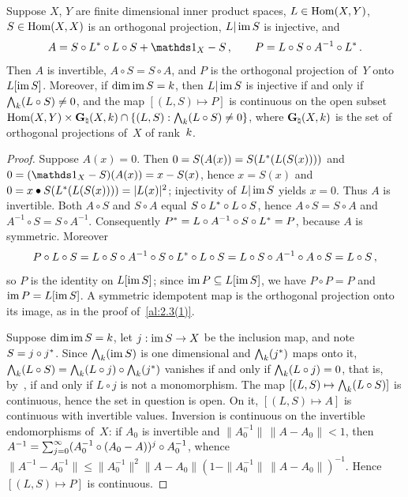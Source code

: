 \begin{lemma}[new\MS]
    \label{new:projection_formula}
    Suppose $X$, $Y$ are finite dimensional inner product spaces, $L \in \operatorname{Hom}(X,Y)$, $S \in
    \operatorname{Hom}(X,X)$ is an orthogonal projection, $L | \operatorname{im} S$ is injective, and
    \begin{displaymath}
        A = S \circ \transpose{L} \circ L \circ S + \id{X} - S \,, \qquad P = L \circ S \circ
        A^{-1} \circ \transpose{L} \,.
    \end{displaymath}
    Then $A$ is invertible, $A \circ S = S \circ A$, and $P$ is the orthogonal projection of~$Y$
    onto $L[\operatorname{im} S]$. Moreover, if $\dim \operatorname{im} S = k$, then $L | \operatorname{im} S$ is injective if and
    only if ${\textstyle\boldsymbol{\bigwedge}}_{{k}}(L \circ S) \ne 0$, and the map $[(L,S) \mapsto P]$ is continuous on
    the open subset $\operatorname{Hom}(X,Y) \times \mathbf{G}_{\natural}(X,k) \cap \{ (L,S) : {\textstyle\boldsymbol{\bigwedge}}_{{k}}(L
    \circ S) \ne 0 \}$, where $\mathbf{G}_{\natural}(X,k)$ is the set of orthogonal projections of~$X$
    of rank~$k$.
\end{lemma}

\begin{proof}
    Suppose $A(x) = 0$. Then $0 = S(A(x)) = S(L^{*}(L(S(x))))$ and $0 = (\id{X} -
    S)(A(x)) = x - S(x)$, hence $x = S(x)$ and $0 = x \bullet S(L^{*}(L(S(x)))) =
    |L(x)|^2$; injectivity of $L | \operatorname{im} S$ yields $x = 0$. Thus $A$ is invertible. Both $A
    \circ S$ and $S \circ A$ equal $S \circ L^{*} \circ L \circ S$, hence $A \circ S = S
    \circ A$ and $A^{-1} \circ S = S \circ A^{-1}$. Consequently $P^{*} = L \circ
    A^{-1} \circ S \circ L^{*} = P$, because $A$ is symmetric. Moreover
    \begin{displaymath}
        P \circ L \circ S = L \circ S \circ A^{-1} \circ S \circ L^{*} \circ L \circ S =
        L \circ S \circ A^{-1} \circ A \circ S = L \circ S \,,
    \end{displaymath}
    so $P$ is the identity on $L[\operatorname{im} S]$; since $\operatorname{im} P \subseteq L[\operatorname{im} S]$, we have $P \circ P
    = P$ and $\operatorname{im} P = L[\operatorname{im} S]$. A symmetric idempotent map is the orthogonal projection onto
    its image, as in the proof of~\ref{al:2.3(1)}.

    Suppose $\dim \operatorname{im} S = k$, let $j : \operatorname{im} S \to X$ be the inclusion map, and note $S = j
    \circ j^{*}$. Since ${\textstyle\boldsymbol{\bigwedge}}_{{k}}(\operatorname{im} S)$ is one dimensional and
    ${\textstyle\boldsymbol{\bigwedge}}_{{k}}(j^{*})$ maps onto it, ${\textstyle\boldsymbol{\bigwedge}}_{{k}}(L \circ S) =
    {\textstyle\boldsymbol{\bigwedge}}_{{k}}(L \circ j) \circ {\textstyle\boldsymbol{\bigwedge}}_{{k}}(j^{*})$ vanishes if and only if
    ${\textstyle\boldsymbol{\bigwedge}}_{{k}}(L \circ j) = 0$, that is, by~\cite[1.7.6]{Federer1969}, if and only if $L
    \circ j$ is not a monomorphism. The map $[(L,S) \mapsto {\textstyle\boldsymbol{\bigwedge}}_{{k}}(L \circ S)]$ is
    continuous, hence the set in question is open. On it, $[(L,S) \mapsto A]$ is continuous with
    invertible values. Inversion is continuous on the invertible endomorphisms of~$X$: if
    $A_0$ is invertible and $\|A_0^{-1}\| \, \|A - A_0\| < 1$, then $A^{-1} =
    {\textstyle\sum_{j=0}^{\infty}} (A_0^{-1} \circ (A_0 - A))^j \circ A_0^{-1}$, whence $\|A^{-1} -
    A_0^{-1}\| \le \|A_0^{-1}\|^2 \|A - A_0\| (1 - \|A_0^{-1}\| \, \|A - A_0\|)^{-1}$. Hence
    $[(L,S) \mapsto P]$ is continuous.
\end{proof}

